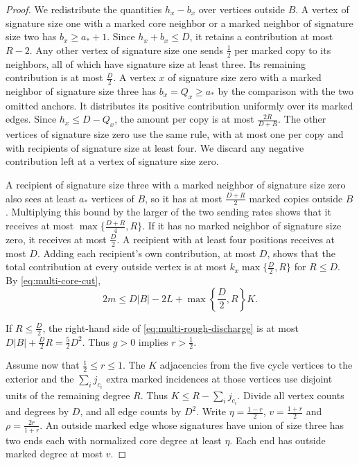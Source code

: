 \documentclass[preprint,11pt,numbers]{elsarticle-arxiv}
\numberwithin{equation}{section}
\theoremstyle{definition}
\begin{document}
\begin{proof}
We redistribute the quantities $h_x-b_x$ over vertices outside $B$.
A vertex of signature size one with a marked core neighbor or a
marked neighbor of signature size two has $b_x\ge a_*+1$. Since
$h_x+b_x\le D$, it retains a contribution at most $R-2$. Any other
vertex of signature size one sends $\frac{1}{2}$ per marked copy to
its neighbors, all of which have signature size at least three. Its
remaining contribution is at most $\frac{D}{2}$. A vertex $x$ of
signature size zero with a marked neighbor of signature size three
has $b_x=Q_x\ge a_*$ by the comparison with the two omitted anchors.
It distributes its positive contribution uniformly over its marked
edges. Since $h_x\le D-Q_x$, the amount per copy is at most
$\frac{2R}{D+R}$. The other vertices of signature size zero use the
same rule, with at most one per copy and with recipients of
signature size at least four. We discard any negative contribution
left at a vertex of signature size zero.

A recipient of signature size three with a marked neighbor of
signature size zero also sees at least $a_*$ vertices of $B$, so it
has at most $\frac{D+R}{2}$ marked copies outside $B$. Multiplying
this bound by the larger of the two sending rates shows that it
receives at most $\max\{\frac{D+R}{4},R\}$. If it has no marked
neighbor of signature size zero, it receives at most $\frac{D}{2}$.
A recipient with at least four positions receives at most $D$.
Adding each recipient's own contribution, at most $D$, shows that
the total contribution at every outside vertex is at most
$k_x\max\{\frac{D}{2},R\}$ for $R\le D$. By \eqref{eq:multi-core-cut},
\begin{equation}\label{eq:multi-rough-discharge}
2m\le D|B|-2L+\max\left\{\frac{D}{2},R\right\}K.
\end{equation}

If $R\le \frac{D}{2}$, the right-hand side of \eqref{eq:multi-rough-discharge}
is at most $D|B|+\frac{D}{2}R=\frac{5}{2}D^2$.
Thus $g>0$ implies $r>\frac{1}{2}$.

Assume now that $\frac{1}{2}\le r\le1$. The $K$ adjacencies from the
five cycle vertices to the exterior and the $\sum_i j_{c_i}$ extra marked
incidences at those vertices use disjoint units of the remaining
degree $R$. Thus $K\le R-\sum_i j_{c_i}$.
Divide all vertex counts and degrees by $D$, and all
edge counts by $D^2$. Write $\eta=\frac{1-r}{2}$, $v=\frac{1+r}{2}$
and $\rho=\frac{2r}{1+r}$. An outside marked edge whose signatures
have union of size three has two ends each with normalized core
degree at least $\eta$. Each end has outside marked degree at most
$v$.


\end{proof}
\end{document}
